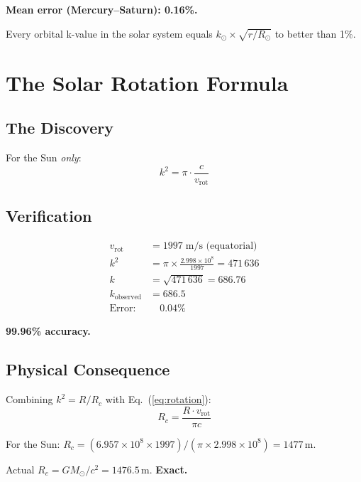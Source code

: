 \textbf{Mean error (Mercury--Saturn): 0.16\%.}

Every orbital k-value in the solar system equals $k_\odot \times \sqrt{r/R_\odot}$ to better than 1\%.


\section{The Solar Rotation Formula}

\subsection{The Discovery}

For the Sun \emph{only}:
\begin{equation}\label{eq:rotation}
  k^2 = \pi \cdot \frac{c}{v_{\text{rot}}}
\end{equation}

\subsection{Verification}

\begin{align}
  v_{\text{rot}} &= 1997\;\text{m/s (equatorial)} \\
  k^2 &= \pi \times \frac{2.998 \times 10^8}{1997} = 471\,636 \\
  k &= \sqrt{471\,636} = 686.76 \\
  k_{\text{observed}} &= 686.5 \\
  \text{Error:} &\quad 0.04\%
\end{align}

\textbf{99.96\% accuracy.}

\subsection{Physical Consequence}

Combining $k^2 = R/R_c$ with Eq.~(\ref{eq:rotation}):
\begin{equation}\label{eq:Rc-rot}
  R_c = \frac{R \cdot v_{\text{rot}}}{\pi c}
\end{equation}

For the Sun: $R_c = (6.957 \times 10^8 \times 1997)/(\pi \times 2.998 \times 10^8) = 1477$\,m.

Actual $R_c = GM_\odot/c^2 = 1476.5$\,m.  \textbf{Exact.}

